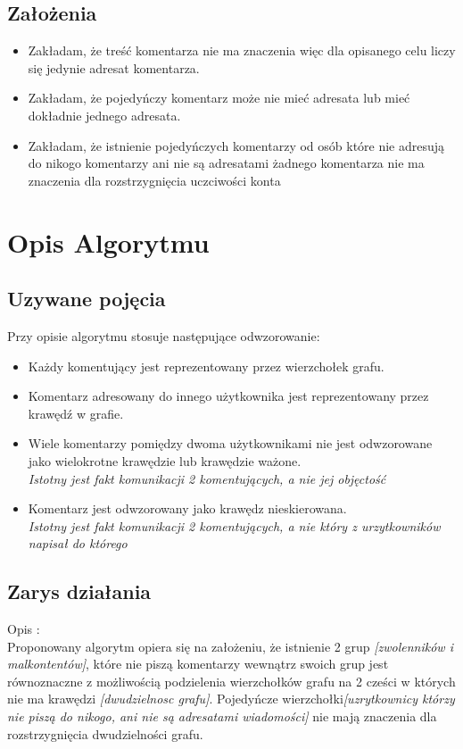 \documentclass[11pt]{article} %
\begin{document}
\subsection{Założenia}
\begin{itemize}
\item
Zakładam, że treść komentarza nie ma znaczenia więc dla opisanego celu liczy się jedynie adresat komentarza.
\item
Zakładam, że pojedyńczy komentarz może nie mieć adresata lub mieć dokładnie jednego adresata.
\item
Zakładam, że istnienie pojedyńczych komentarzy od osób które nie adresują do nikogo komentarzy ani nie są adresatami żadnego komentarza nie ma znaczenia dla rozstrzygnięcia uczciwości konta
\end{itemize}
\section{Opis Algorytmu}
\subsection{Uzywane pojęcia}
Przy opisie algorytmu stosuje następujące odwzorowanie:
\begin{itemize}
\item
Każdy komentujący jest reprezentowany przez wierzchołek grafu.
\item
Komentarz adresowany do innego użytkownika jest reprezentowany przez krawędź w grafie.
\item
Wiele komentarzy pomiędzy dwoma użytkownikami nie jest odwzorowane jako wielokrotne krawędzie lub krawędzie ważone.\\
 \textsl{Istotny jest fakt komunikacji 2 komentujących, a nie jej objęctość}
\item
Komentarz jest odwzorowany jako krawędz nieskierowana. \\
\textsl{Istotny jest fakt komunikacji 2 komentujących, a nie który z urzytkowników napisał do którego}
\end{itemize}
\subsection{Zarys działania}
\begin{paragraph}{Opis :\\}
   Proponowany algorytm opiera się na założeniu, że istnienie 2 grup \textsl{[zwolenników i malkontentów]}, które nie piszą komentarzy wewnątrz swoich grup jest równoznaczne z możliwością podzielenia wierzchołków grafu na 2 cześci w których nie ma krawędzi \textsl{[dwudzielnosc grafu]}. Pojedyńcze wierzchołki\textsl{[uzrytkownicy którzy nie piszą do nikogo, ani nie są adresatami wiadomości]} nie mają znaczenia dla rozstrzygnięcia dwudzielności grafu.
\end{paragraph}
\end{document}
